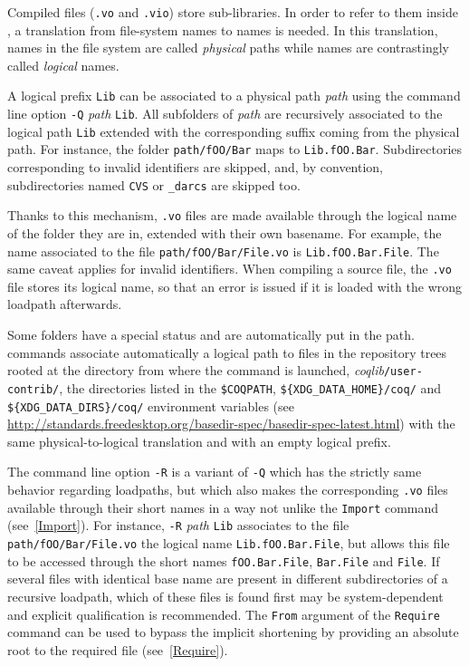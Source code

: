 Compiled files (\texttt{.vo} and \texttt{.vio}) store sub-libraries. In
order to refer to them inside {\Coq}, a translation from file-system
names to {\Coq} names is needed. In this translation, names in the
file system are called {\em physical} paths while {\Coq} names are
contrastingly called {\em logical} names.

A logical prefix {\tt Lib} can be associated to a physical path
\textrm{\textsl{path}} using the command line option {\tt -Q}
\textrm{\textsl{path}} {\tt Lib}. All subfolders of {\textsl{path}} are
recursively associated to the logical path {\tt Lib} extended with the
corresponding suffix coming from the physical path. For instance, the
folder {\tt path/fOO/Bar} maps to {\tt Lib.fOO.Bar}. Subdirectories
corresponding to invalid {\Coq} identifiers are skipped, and, by
convention, subdirectories named {\tt CVS} or {\tt \_darcs} are
skipped too.

Thanks to this mechanism, {\texttt{.vo}} files are made available through the
logical name of the folder they are in, extended with their own basename. For
example, the name associated to the file {\tt path/fOO/Bar/File.vo} is
{\tt Lib.fOO.Bar.File}. The same caveat applies for invalid identifiers.
When compiling a source file, the {\texttt{.vo}} file stores its logical name,
so that an error is issued if it is loaded with the wrong loadpath afterwards.

Some folders have a special status and are automatically put in the path.
{\Coq} commands associate automatically a logical path to files
in the repository trees rooted at the directory from where the command
is launched, \textit{coqlib}\texttt{/user-contrib/}, the directories
listed in the \verb:$COQPATH:, \verb:${XDG_DATA_HOME}/coq/: and
\verb:${XDG_DATA_DIRS}/coq/: environment variables (see
\url{http://standards.freedesktop.org/basedir-spec/basedir-spec-latest.html})
with the same physical-to-logical translation and with an empty logical prefix.

The command line option \texttt{-R} is a variant of \texttt{-Q} which has the
strictly same behavior regarding loadpaths, but which also makes the
corresponding \texttt{.vo} files available through their short names in a
way not unlike the {\tt Import} command (see~{\ref{Import}}). For instance,
\texttt{-R} \textrm{\textsl{path}} \texttt{Lib} associates to the file
\texttt{path/fOO/Bar/File.vo} the logical name \texttt{Lib.fOO.Bar.File}, but
allows this file to be accessed through the short names \texttt{fOO.Bar.File},
\texttt{Bar.File} and \texttt{File}. If several files with identical base name
are present in different subdirectories of a recursive loadpath, which of
these files is found first may be system-dependent and explicit
qualification is recommended. The {\tt From} argument of the {\tt Require}
command can be used to bypass the implicit shortening by providing an absolute
root to the required file (see~\ref{Require}).

